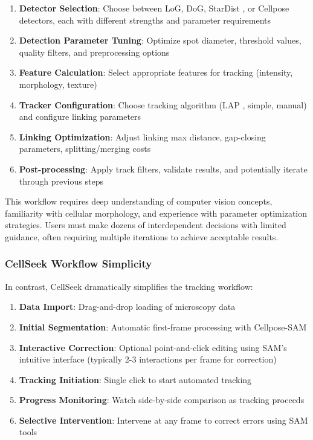 \documentclass[../cellseek_paper.tex]{subfiles}
\begin{document}
\begin{enumerate}
  \item \textbf{Detector Selection}: Choose between LoG, DoG, StarDist \cite{schmidt2018cell}, or Cellpose \cite{stringer2021cellpose} detectors, each with different strengths and parameter requirements
  \item \textbf{Detection Parameter Tuning}: Optimize spot diameter, threshold values, quality filters, and preprocessing options
  \item \textbf{Feature Calculation}: Select appropriate features for tracking (intensity, morphology, texture)
  \item \textbf{Tracker Configuration}: Choose tracking algorithm (LAP \cite{jaqaman2008robust}, simple, manual) and configure linking parameters
  \item \textbf{Linking Optimization}: Adjust linking max distance, gap-closing parameters, splitting/merging costs
  \item \textbf{Post-processing}: Apply track filters, validate results, and potentially iterate through previous steps
\end{enumerate}

This workflow requires deep understanding of computer vision concepts, familiarity with cellular morphology, and experience with parameter optimization strategies. Users must make dozens of interdependent decisions with limited guidance, often requiring multiple iterations to achieve acceptable results.

\subsubsection{CellSeek Workflow Simplicity}

In contrast, CellSeek dramatically simplifies the tracking workflow:

\begin{enumerate}
  \item \textbf{Data Import}: Drag-and-drop loading of microscopy data
  \item \textbf{Initial Segmentation}: Automatic first-frame processing with Cellpose-SAM
  \item \textbf{Interactive Correction}: Optional point-and-click editing using SAM's intuitive interface (typically 2-3 interactions per frame for correction)
  \item \textbf{Tracking Initiation}: Single click to start automated tracking
  \item \textbf{Progress Monitoring}: Watch side-by-side comparison as tracking proceeds
  \item \textbf{Selective Intervention}: Intervene at any frame to correct errors using SAM tools
\end{enumerate}
\end{document}

